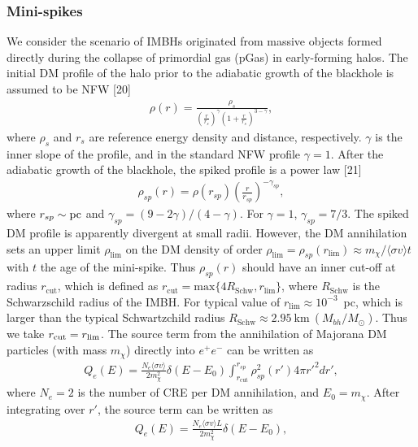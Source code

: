 \subsubsection{Mini-spikes}
We consider the scenario of IMBHs originated  from massive objects formed directly during
the collapse of primordial gas (pGas) in early-forming halos.
The initial DM profile of the halo prior to  the adiabatic growth of the blackhole  is 
assumed to be NFW [20] %
\begin{align}
\rho(r)=\frac{\rho_{s}}{\left( \frac{r}{r_{s}} \right)^{\gamma} \left( 1+\frac{r}{r_{s}} \right)^{3-\gamma} }  ,
\end{align}
where $\rho_{s}$ and $r_{s}$ are reference energy density and distance, respectively.
$\gamma$ is the inner slope of the profile, and in the standard NFW profile $\gamma=1$.
After the adiabatic growth of the blackhole, the spiked profile is a power law%
[21] %
\begin{align}
\rho_{sp}(r)=\rho(r_{sp})\left( \frac{r}{r_{sp}}\right)^{-\gamma_{sp}} ,
\end{align}
where
$r_{sp}\sim \text{pc}$ and
$\gamma_{sp}=(9-2\gamma)/(4-\gamma)$.
For $\gamma=1$, $\gamma_{sp}=7/3$.
The spiked DM profile is apparently divergent at small radii.
However, the DM annihilation sets an upper limit $\rho_{\text{lim}}$ on the DM density
of order 
$\rho_{\text{lim}}=\rho_{sp}(r_{\text{lim}})\approx m_{\chi}/\langle\sigma v\rangle t$ with $t$ the age of the mini-spike.
Thus $\rho_{sp}(r)$ should have an inner cut-off at radius $r_{\text{cut}}$,
which is defined as
$r_{\text{cut}}=\text{max}\{4 R_{\text{Schw}}, r_{\text{lim}}\}$,
where $R_{\text{Schw}}$ is the Schwarzschild radius of the IMBH.
For typical value of $r_{\text{lim}}\approx 10^{-3}$~pc, 
which is larger than the typical Schwartzchild radius  
$R_{\text{Schw}}\approx 2.95~\text{km}~ (M_{bh}/M_{\odot})$.
Thus we take $r_{\text{cut}}=r_{\text{lim}}$.
The source term from the annihilation of Majorana DM particles (with mass $m_{\chi}$) 
directly into $e^{+}e^{-}$ can be written as
\begin{align}
Q_{e}(E)=\frac{N_{e} \langle\sigma v\rangle}{2 m_{\chi}^{2}}  
\delta(E-E_{0})
\int_{r_{\text{cut}}}^{r_{sp}} \rho_{sp}^{2}(r') 4\pi r'^{2} dr' ,
\end{align}
where $N_{e}=2$ is the number of CRE per DM annihilation, and  
$E_{0}=m_{\chi}$.
After integrating over $r'$, the source term can be written as 
\begin{align}
Q_{e}(E)=\frac{N_{e} \langle\sigma v\rangle L}{2 m_{\chi}^{2}} 
\delta(E-E_{0})  ,
\end{align}
